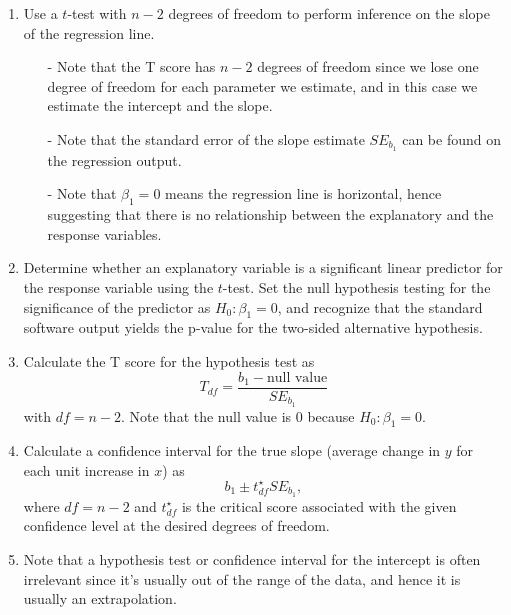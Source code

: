 \documentclass[11pt]{article}
\begin{document}
%

\vspace{0.48cm}

%

\begin{enumerate}[resume]
\renewcommand\labelenumi{\textcolor{light}{\textbf{LO \theenumi.}}}

\item Use a $t$-test with $n-2$ degrees of freedom to perform inference on the slope of the regression line.
\begin{itemize}
\item[-] Note that the T score has $n-2$ degrees of freedom since we lose one degree of freedom for each parameter we estimate, and in this case we estimate the intercept and the slope.
\item[-] Note that the standard error of the slope estimate $SE_{b_1}$ can be found on the regression output.
\item[-] Note that $\beta_1 = 0$ means the regression line is horizontal, hence suggesting that there is no relationship between the explanatory and the response variables.
\end{itemize}

\item Determine whether an explanatory variable is a significant linear predictor for the response variable using the $t$-test.  Set the null hypothesis testing for the significance of the predictor as $H_0: \beta_1 = 0$, and recognize that the standard software output yields the p-value for the two-sided alternative hypothesis.


\item Calculate the T score for the hypothesis test as 
\[ T_{df} = \frac{b_1 - \text{null value}}{SE_{b_1}} \]
with $df = n - 2$.  Note that the null value is 0 because $H_0: \beta_1 = 0$.



\item Calculate a confidence interval for the true slope (average change in $y$ for each unit increase in $x$) as
\[ b_1 \pm t^\star_{df} SE_{b_1}, \]
where $df = n - 2$ and $t^\star_{df}$ is the critical score associated with the given confidence level at the desired degrees of freedom.


\item Note that a hypothesis test or confidence interval for the intercept is often irrelevant since it's usually out of the range of the data, and hence it is usually an extrapolation.
\end{enumerate}
\end{document}
